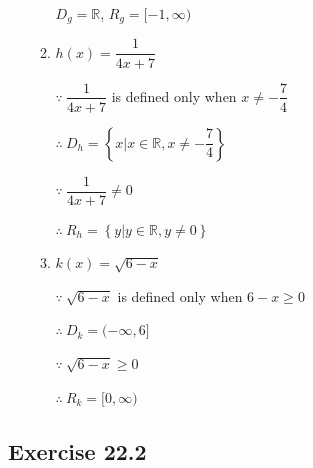 \documentclass[12pt]{report}
\begin{document}
\begin{enumerate}
\begin{multicols}{2}
\begin{enumerate}
                  $D_g = \mathbb{R}$, $R_g = [-1, \infty)$

            \item $h(x) = \dfrac{1}{4x + 7}$
                  \sol{}

                  $\because\ \dfrac{1}{4x + 7}$ is defined only when $x \neq -\dfrac{7}{4}$

                  $\therefore\ D_h = \left\{x \vert x \in \mathbb{R}, x \neq -\dfrac{7}{4}\right\}$

                  $\because\ \dfrac{1}{4x + 7} \neq 0$

                  $\therefore\ R_h = \left\{y \vert y \in \mathbb{R}, y \neq 0\right\}$

            \item $k(x) = \sqrt{6 - x}$
                  \sol{}

                  $\because\ \sqrt{6 - x}$ is defined only when $6 - x \geq 0$

                  $\therefore\ D_k = (-\infty, 6]$

                  $\because\ \sqrt{6 - x} \geq 0$

                  $\therefore\ R_k = [0, \infty)$
          \end{enumerate}
        \end{multicols}
\end{enumerate}

\newpage

\subsection{Exercise 22.2}
\end{document}
